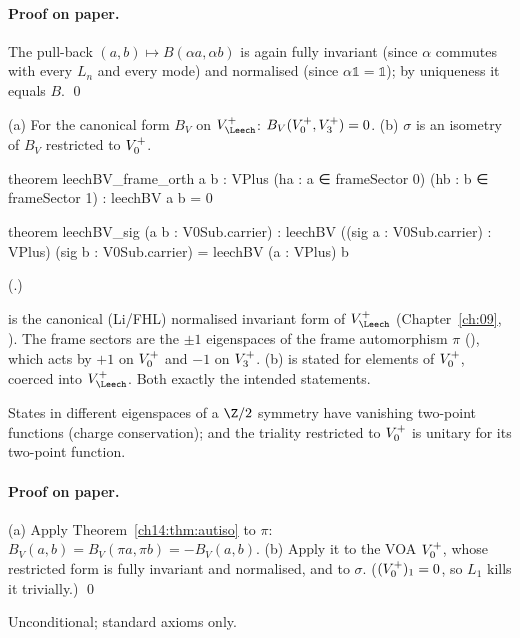 \paragraph{Proof on paper.}  The pull-back $(a,b)\mapsto B(\alpha a,\alpha b)$ is again fully
invariant (since $\alpha$ commutes with every $L_n$ and every mode) and normalised (since
$\alpha\mathbb 1=\mathbb 1$); by uniqueness it equals $B$. \qed

\begin{corollary}\label{ch14:cor:orth}
(a) For the canonical form $B_V$ on $V_\Leech^+$: $B_V(V_0^{+},V_3^{+})=0$.
(b) $\sigma$ is an isometry of $B_V$ restricted to $V_0^{+}$.
\end{corollary}
\begin{leancode}
theorem leechBV_frame_orth {a b : VPlus} (ha : a ∈ frameSector 0) (hb : b ∈ frameSector 1) :
    leechBV a b = 0

theorem leechBV_sig (a b : V0Sub.carrier) :
    leechBV ((sig a : V0Sub.carrier) : VPlus) (sig b : V0Sub.carrier) = leechBV (a : VPlus) b
\end{leancode}
(.)

\begin{dictionary}
 is the canonical (Li/FHL) normalised invariant form of $V_\Leech^+$ (Chapter~\ref{ch:09},
).  The frame sectors are the $\pm1$ eigenspaces of the frame automorphism
$\pi$ (), which acts by $+1$ on $V_0^{+}$ and $-1$ on $V_3^{+}$.  (b) is stated for
elements of $V_0^{+}$, coerced into $V_\Leech^+$.  Both exactly the intended statements.
\end{dictionary}
\begin{physics}
States in different eigenspaces of a $\Z/2$ symmetry have vanishing two-point functions (charge conservation); and the triality restricted to $V_0^{+}$ is unitary for its two-point function.
\end{physics}


\paragraph{Proof on paper.}  (a) Apply Theorem~\ref{ch14:thm:autiso} to $\pi$:
$B_V(a,b)=B_V(\pi a,\pi b)=-B_V(a,b)$.  (b) Apply it to the VOA $V_0^{+}$, whose restricted form is
fully invariant and normalised, and to $\sigma$.  ($(V_0^{+})_1=0$, so $L_1$ kills it trivially.) \qed

\begin{status}Unconditional; standard axioms only.\end{status}

